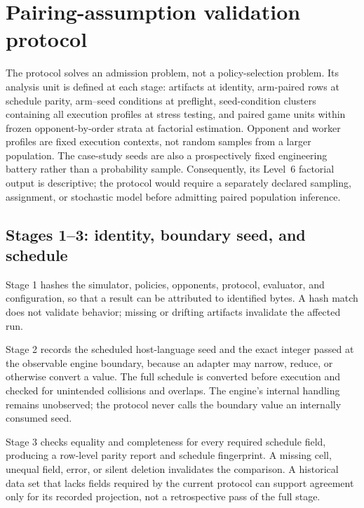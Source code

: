 \documentclass[aps,reprint,superscriptaddress,longbibliography,floatfix]{revtex4-2}
\begin{document}
\section{Pairing-assumption validation protocol}

The protocol solves an admission problem, not a policy-selection problem.  Its
analysis unit is defined at each stage: artifacts at identity, arm-paired rows
at schedule parity, arm--seed conditions at preflight, seed-condition clusters
containing all execution profiles at stress testing, and paired game units
within frozen opponent-by-order strata at factorial estimation.  Opponent and
worker profiles are fixed execution contexts, not random samples from a larger
population.  The case-study seeds are also a prospectively fixed engineering
battery rather than a probability sample.  Consequently, its Level~6 factorial
output is descriptive; the protocol would require a separately declared
sampling, assignment, or stochastic model before admitting paired population
inference.



\subsection{Stages 1--3: identity, boundary seed, and schedule}

Stage 1 hashes the simulator, policies, opponents, protocol, evaluator, and
configuration, so that a result can be attributed to identified bytes.  A hash
match does not validate behavior; missing or drifting artifacts invalidate the
affected run.

Stage 2 records the scheduled host-language seed and the exact integer passed
at the observable engine boundary, because an adapter may narrow, reduce, or
otherwise convert a value.  The full schedule is converted before execution
and checked for unintended collisions and overlaps.  The engine's internal
handling remains unobserved; the protocol never calls the boundary value an
internally consumed seed.

Stage 3 checks equality and completeness for every required schedule field,
producing a row-level parity report and schedule fingerprint.  A missing
cell, unequal field, error, or silent deletion invalidates the comparison.  A
historical data set that lacks fields required by the current protocol can
support agreement only for its recorded projection, not a retrospective pass
of the full stage.
\end{document}
